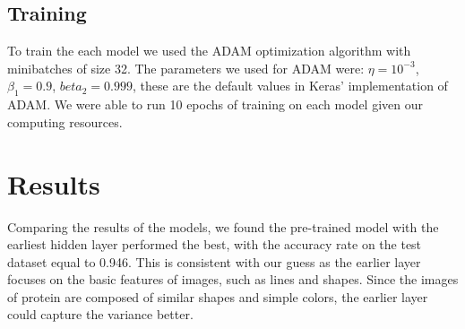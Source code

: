 \documentclass{article}
\begin{document}
\subsection{Training}
To train the each model we used the ADAM optimization algorithm\cite{kingma2014adam} with minibatches of size 32.
The parameters we used for ADAM were: $\eta = 10^{-3}$, $\beta_1 = 0.9$, $beta_2=0.999$, these
are the default values in Keras' implementation of ADAM.
We were able to run 10 epochs of training on each model given our computing resources. 
\section{Results}
Comparing the results of the models, we found the pre-trained model with the earliest hidden layer performed the best, with the accuracy rate on the test dataset equal to 0.946. This is consistent with our guess as the earlier layer focuses on the basic features of images, such as lines and shapes. Since the images of protein are composed of similar shapes and simple colors, the earlier layer could capture the variance better. 
\end{document}
